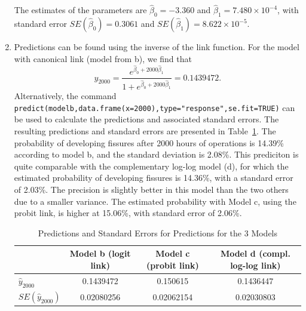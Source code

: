 \begin{solution}{5.9}
\begin{enumerate}
The estimates of the parameters are $\hat{\beta}_{0}=-3.360$ and $\hat{\beta}_{1}=7.480\times10^{-4}$, with standard error $SE(\hat{\beta}_{0})=0.3061$ and $SE(\hat{\beta}_{1})=8.622\times10^{-5}$.

\item Predictions can be found using the inverse of the link function. For the model with canonical link (model from b), we find that $$\hat{y}_{2000}=\frac{e^{\hat{\beta}_{0}+2000\hat{\beta}_{1}}}{1+e^{\hat{\beta}_{0}+2000\hat{\beta}_{1}}}=0.1439472.$$ Alternatively, the command \texttt{predict(modelb,data.frame(x=2000),type="response",se.fit=TRUE)} can be used to calculate the predictions and associated standard errors. The resulting predictions and standard errors are presented in Table~\ref{tab:glm:pred}. The probability of developing fissures after 2000 hours of operations is 14.39\% according to model b, and the standard deviation is 2.08\%. This prediciton is quite comparable with the complementary log-log model (d), for which the estimated probability of developing fissures is 14.36\%, with a standard error of 2.03\%. The precision is slightly better in this model than the two others due to a smaller variance. The estimated probability with Model c, using the probit link, is higher at 15.06\%, with standard error of 2.06\%.
\begin{table}[htbp]
\begin{center}
\begin{tabular}{|l||c|c|c|}
  \hline
   & Model b (logit link) & Model c (probit link) & Model d (compl. log-log link) \\
  \hline
  \hline
	 $\hat{y}_{2000}$ &0.1439472 & 0.150615 & 0.1436447\\ \hline
	 $SE(\hat{y}_{2000})$ &0.02080256 & 0.02062154 & 0.02030803 \\ \hline
\end{tabular}
\caption{Predictions and Standard Errors for Predictions for the 3 Models} \label{tab:glm:pred}
\end{center}
\end{table}


\end{enumerate}
\end{solution}
